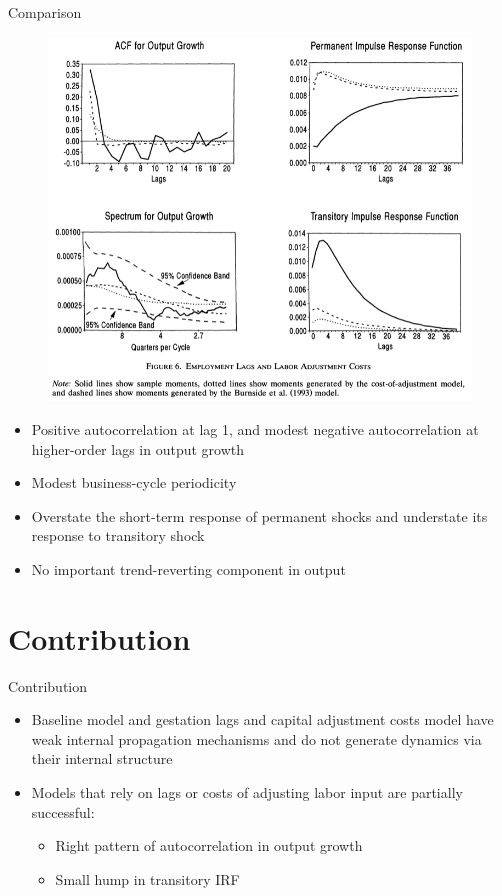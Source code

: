 \documentclass[10pt]{beamer}
\begin{document}
\begin{frame}{Comparison}
\begin{figure}
    \centering
  \includegraphics[width=0.57\linewidth]{labor cost.png}
\end{figure}
{\footnotesize
\begin{itemize}
    \item Positive autocorrelation at lag 1, and modest negative autocorrelation at higher-order lags in output growth
    \item Modest business-cycle periodicity
    \item Overstate the short-term response of permanent shocks and understate its response to transitory shock
    \item No important trend-reverting component in output
\end{itemize}}
\end{frame}

\section{Contribution}

\begin{frame}{Contribution}
\begin{itemize}
    \item Baseline model and gestation lags and capital adjustment costs model have weak internal propagation mechanisms and do not generate dynamics via their internal structure
    \item Models that rely on lags or costs of adjusting labor input are partially successful: 
    \begin{itemize}
        \item Right pattern of autocorrelation in output growth
        \item Small hump in transitory IRF
    \end{itemize}
\end{itemize}
    
\end{frame}
\end{document}
